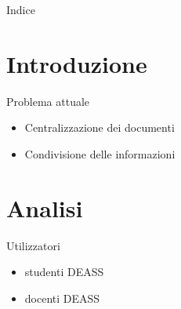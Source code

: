\documentclass{beamer}
\begin{document}
\makeatletter
    \newenvironment{withoutfootline}{
        \setbeamertemplate{footline}[default]
        \def\beamer@entrycode{\vspace*{\footheight}}
    }{}
\makeatother


\AtBeginSection[] { 
  \begin{frame}
	\mysectionpage
  \end{frame} 
} 


\maketitle
\begin{frame}{Indice}
   \tableofcontents
 
\end{frame}


\section{Introduzione}
\begin{frame}{Problema attuale}
	 \begin{itemize}
	\item Centralizzazione dei documenti
	\item Condivisione delle informazioni
\end{itemize}
\end{frame}


\section{Analisi}
\begin{frame}{Utilizzatori}
\begin{itemize}
	\item studenti DEASS
	\item docenti DEASS
\end{itemize}
\end{frame}
\end{document}

